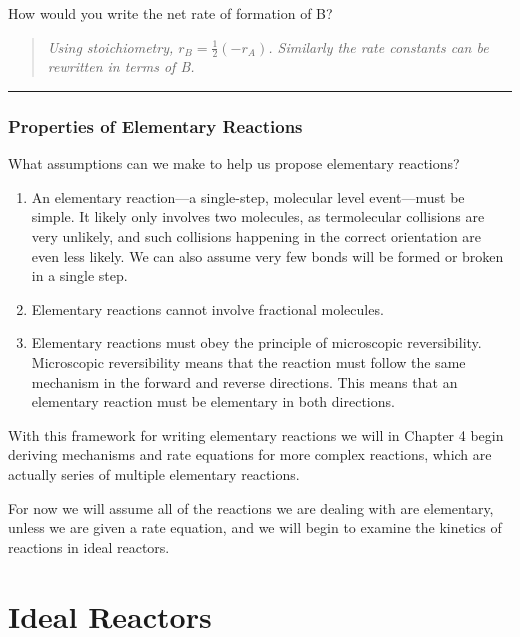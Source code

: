 \documentclass[
]{article}
\begin{document}
How would you write the net rate of formation of B?

\begin{quote}
\emph{Using stoichiometry, \(r_B = \frac{1}{2}(-r_A)\). Similarly the rate constants can be rewritten in terms of B.}
\end{quote}

\begin{center}\rule{0.5\linewidth}{0.5pt}\end{center}

\hypertarget{properties-of-elementary-reactions}{%
\subsubsection{Properties of Elementary Reactions}\label{properties-of-elementary-reactions}}

What assumptions can we make to help us propose elementary reactions?

\begin{enumerate}
\def\labelenumi{\arabic{enumi}.}
\item
  An elementary reaction---a single-step, molecular level event---must be simple. It likely only involves two molecules, as termolecular collisions are very unlikely, and such collisions happening in the correct orientation are even less likely. We can also assume very few bonds will be formed or broken in a single step.
\item
  Elementary reactions cannot involve fractional molecules.
\item
  Elementary reactions must obey the principle of microscopic reversibility. Microscopic reversibility means that the reaction must follow the same mechanism in the forward and reverse directions. This means that an elementary reaction must be elementary in both directions.
\end{enumerate}

With this framework for writing elementary reactions we will in Chapter 4 begin deriving mechanisms and rate equations for more complex reactions, which are actually series of multiple elementary reactions.

For now we will assume all of the reactions we are dealing with are elementary, unless we are given a rate equation, and we will begin to examine the kinetics of reactions in ideal reactors.

\hypertarget{ideal-reactors}{%
\section{Ideal Reactors}\label{ideal-reactors}}
\end{document}
